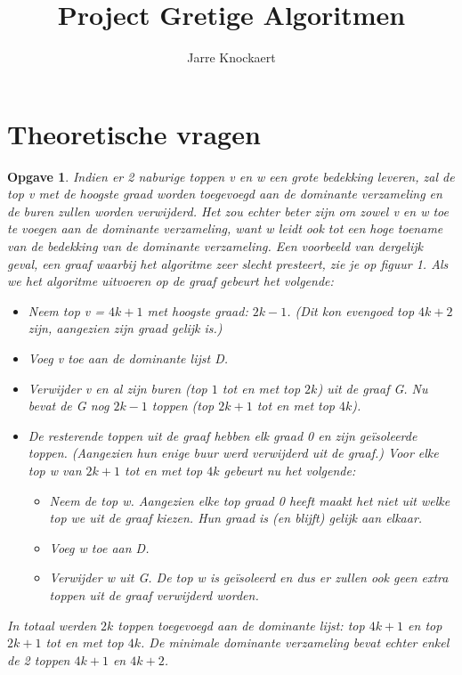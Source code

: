 \documentclass[11pt, a4paper]{article}
\newtheorem{opgave}{Opgave}
\begin{document}
	\title{Project Gretige Algoritmen}
	\author{Jarre Knockaert}
	\maketitle

\newpage

\section{Theoretische vragen}
\begin{opgave}
	Indien er 2 naburige toppen v en w een grote bedekking leveren, zal de top v met de hoogste graad worden toegevoegd aan de dominante verzameling en de buren zullen worden verwijderd. Het zou echter beter zijn om zowel v en w toe te voegen aan de dominante verzameling, want w leidt ook tot een hoge toename van de bedekking van de dominante verzameling. 
	Een voorbeeld van dergelijk geval, een graaf waarbij het algoritme zeer slecht presteert, zie je op figuur 1. Als we het algoritme uitvoeren op de graaf gebeurt het volgende:
	\begin{itemize}
		\item Neem top v = $4k+1$ met hoogste graad: $2k-1$. (Dit kon evengoed top $4k+2$ zijn, aangezien zijn graad gelijk is.)
		\item Voeg v toe aan de dominante lijst D. 
		\item Verwijder v en al zijn buren (top $1$ tot en met top $2k$) uit de graaf G. Nu bevat de G nog $2k-1$ toppen (top $2k+1$ tot en met top $4k$).
		\item De resterende toppen uit de graaf hebben elk graad 0 en zijn ge\"{i}soleerde toppen. (Aangezien hun enige buur werd verwijderd uit de graaf.) Voor elke top w van $2k+1$ tot en met top $4k$ gebeurt nu het volgende:
		\begin{itemize}
			\item Neem de top w. Aangezien elke top graad 0 heeft maakt het niet uit welke top we uit de graaf kiezen. Hun graad is (en blijft) gelijk aan elkaar. 
			\item Voeg w toe aan D. 
			\item Verwijder w uit G. De top w is geïsoleerd en dus er zullen ook geen extra toppen uit de graaf verwijderd worden. 
		\end{itemize}
	\end{itemize}
	In totaal werden $2k$ toppen toegevoegd aan de dominante lijst: top $4k+1$ en top $2k+1$ tot en met top $4k$. De minimale dominante verzameling bevat echter enkel de 2 toppen $4k+1$ en $4k+2$. 

\end{opgave}
\end{document}
